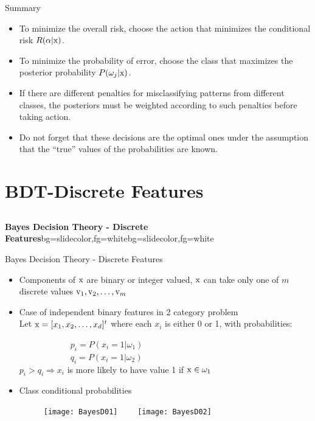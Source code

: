 \begin{frame}{Summary}
\begin{itemize}
\setlength{\itemsep}{6pt}
\item To minimize the overall risk, choose the action that
minimizes the conditional risk $R(\alpha|{\rm x})$.
\item To minimize the probability of error, choose the class that maximizes the posterior probability $P(\omega_j|{\rm x})$.
\item If there are different penalties for misclassifying patterns
from different classes, the posteriors must be weighted
according to such penalties before taking action.
\item Do not forget that these decisions are the optimal ones under the assumption that the ``true'' values of the
probabilities are known.
\end{itemize}
\end{frame}

\section{BDT-Discrete Features}
\subsection{}
\begin{frame}{}
\begin{variableblock}{\centering \Large \textbf{\vspace{4pt}\newline Bayes Decision Theory - Discrete Features\vspace{4pt}}}{bg=slidecolor,fg=white}{bg=slidecolor,fg=white}
\end{variableblock}
\end{frame}

\begin{frame}{Bayes Decision Theory - Discrete Features}
\begin{itemize}
\item Components of ${\rm x}$ are binary or integer valued, ${\rm x}$ can take only one of $m$ discrete values ${\rm v}_1,{\rm v}_2,\ldots,{\rm v}_m$
\item Case of independent binary features in 2 category problem\\
Let ${\rm x}=[x_1,x_2,\ldots,x_d]^t$ where each $x_i$ is either 0 or 1, with probabilities:

~~~~~~~~~~~~$p_i=P(x_i=1|\omega_1)$\\
~~~~~~~~~~~~$q_i=P(x_i=1|\omega_2)$\\
$p_i>q_i\Rightarrow x_i$ is more likely to have value 1 if ${\rm x}\in \omega_1$
\item Class conditional probabilities
\begin{figure}
\texttt{[image: BayesD01]}~~~~
\texttt{[image: BayesD02]}
\end{figure}
\end{itemize}
\end{frame}

